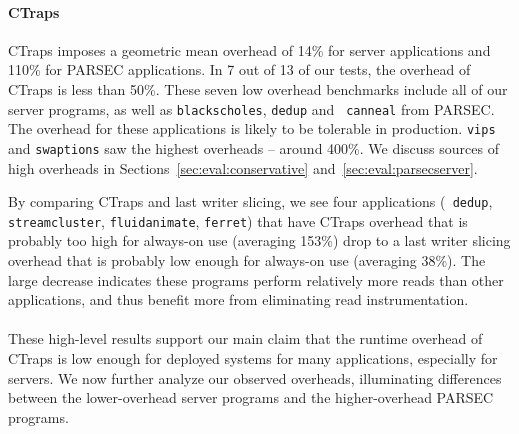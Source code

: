 \documentclass[preprint,9pt]{sigplanconf}
\newcommand{\ctraps}{CTraps\xspace}
\newcommand{\ctrapsfull}{CTraps-Full\xspace}
\newcommand{\ctrapsmm}{CTraps-NRR\xspace}
\begin{document}
\paragraph{\ctraps}
\ctraps imposes a geometric mean overhead of 14\% for server applications
and 110\% for PARSEC applications.  In 7 out of 13 of our tests, the overhead
of \ctraps is less than 50\%.  These seven low overhead benchmarks include
all of our server programs, as well as {\tt blackscholes}, {\tt dedup} and {\tt
canneal} from PARSEC.  The overhead for these applications is likely to be
tolerable in production.  {\tt vips} and {\tt swaptions} saw the highest
overheads -- around 400\%.  We discuss sources of high overheads in
Sections~\ref{sec:eval:conservative} and~\ref{sec:eval:parsecserver}.

By comparing \ctraps and last writer slicing, we see four applications ({\tt
dedup}, {\tt streamcluster}, {\tt fluidanimate}, {\tt ferret}) that have
\ctraps overhead that is probably too high for always-on use (averaging 153\%)
drop to a last writer slicing overhead that is probably low enough for always-on use
(averaging 38\%).  The large decrease indicates these programs perform
relatively more reads than other applications, and thus benefit more from
eliminating read instrumentation.
\\
\\
These high-level results support our main claim that the runtime overhead of
\ctraps is low enough for deployed systems for many 
applications, especially for servers.  We now further analyze our observed overheads, illuminating
differences between the lower-overhead server programs and the higher-overhead
PARSEC programs.
\end{document}
